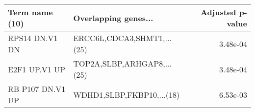 \begin{tabular}{llr}
\toprule
  Term name (10) &       Overlapping genes... &  Adjusted p-value \\
\midrule
  RPS14 DN.V1 DN & ERCC6L,CDCA3,SHMT1,...(25) &          3.48e-04 \\
   E2F1 UP.V1 UP & TOP2A,SLBP,ARHGAP8,...(25) &          3.48e-04 \\
RB P107 DN.V1 UP &  WDHD1,SLBP,FKBP10,...(18) &          6.53e-03 \\
\bottomrule
\end{tabular}
